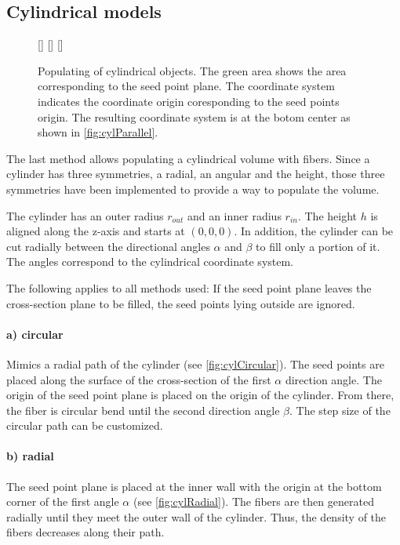 \subsection{Cylindrical models}
%
\begin{figure}[!t]
    \centering
    \setlength{\tikzwidth}{0.3\textwidth}
    [\tikzwidth]{
    }\hfill
    [\tikzwidth]{
    }\hfill
    [\tikzwidth]{
    }
	\caption{Populating of cylindrical objects. The green area shows the area corresponding to the seed point plane. The coordinate system indicates the coordinate origin coresponding to the seed points origin. The resulting coordinate system is at the botom center as shown in \cref{fig:cylParallel}.}
\end{figure}
%
The last method allows populating a cylindrical volume with fibers.
Since a cylinder has three symmetries, a radial, an angular and the height, those three symmetries have been implemented to provide a way to populate the volume.
\par
%
The cylinder has an outer radius $r_{\mathit{out}}$ and an inner radius $r_{\mathit{in}}$.
The height $h$ is aligned along the z-axis and starts at $(0,0,0)$.
In addition, the cylinder can be cut radially between the directional angles $\alpha$ and $\beta$ to fill only a portion of it.
The angles correspond to the cylindrical coordinate system.
\par
%
The following applies to all methods used: If the seed point plane leaves the cross-section plane to be filled, the seed points lying outside are ignored.
%
\paragraph{a) circular}
Mimics a radial path of the cylinder (see \cref{fig:cylCircular}).
The seed points are placed along the surface of the cross-section of the first $\alpha$ direction angle.
The origin of the seed point plane is placed on the origin of the cylinder.
From there, the fiber is circular bend until the second direction angle $\beta$.
The step size of the circular path can be customized.
%
\paragraph{b) radial}
The seed point plane is placed at the inner wall with the origin at the bottom corner of the first angle $\alpha$ (see \cref{fig:cylRadial}).
The fibers are then generated radially until they meet the outer wall of the cylinder.
Thus, the density of the fibers decreases along their path.
%
